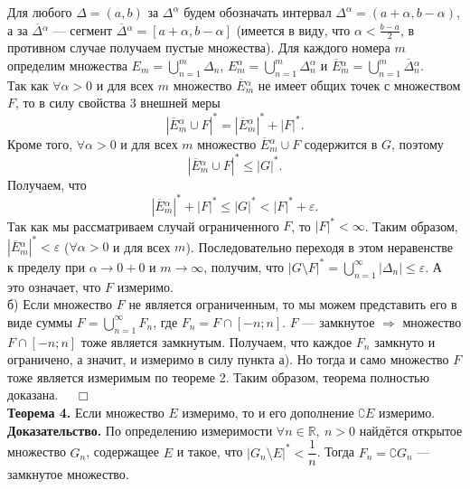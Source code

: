 \documentclass[12pt,a4paper, titlepage]{article}
\begin{document}
Для любого $\Delta = (a, b)$ за $\Delta^\alpha$ будем обозначать интервал $\Delta^\alpha = (a + \alpha, b - \alpha)$, а за $\overline{\Delta}{}^\alpha$ --- сегмент $\overline{\Delta}{}^\alpha = [a + \alpha, b - \alpha]$ (имеется в виду, что $\alpha < \frac{b-a} 2$, в противном случае получаем пустые множества). Для каждого номера $m$ определим множества $E_m = \bigcup\limits_{n=1}^m \Delta_n$, $E_m^\alpha = \bigcup\limits_{n=1}^m \Delta_n^\alpha$ и $\overline{E}{}_m^\alpha = \bigcup\limits_{n=1}^m \overline{\Delta}{}_n^\alpha$.\\

Так как $\forall \alpha > 0$ и для всех $m$ множество $\overline{E}{}_m^\alpha$ не имеет общих точек с множеством $F$, то в силу свойства 3 внешней меры
$$
|\overline{E}{}_m^\alpha \cup F|^* = |\overline{E}{}_m^\alpha|^* + |F|^*.
$$
Кроме того, $\forall \alpha > 0$ и для всех $m$ множество $\overline{E}{}_m^\alpha \cup F$ содержится в $G$, поэтому
$$
|\overline{E}{}_m^\alpha \cup F|^* \leqslant |G|^*.
$$
Получаем, что
$$
|\overline{E}{}_m^\alpha|^* + |F|^* \leqslant |G|^* < |F|^* + \varepsilon.
$$
Так как мы рассматриваем случай ограниченного $F$, то $|F|^* < \infty$. Таким образом, $|\overline{E}{}_m^\alpha|^* < \varepsilon$ ($\forall \alpha > 0$ и для всех $m$). Последовательно переходя в этом неравенстве к пределу при $\alpha \to 0 + 0$ и $m \to \infty$, получим, что $|G \setminus F|^* = \bigcup\limits_{n=1}^\infty |\Delta_n| \leqslant \varepsilon$. А это означает, что $F$ измеримо.\\

б) Если множество $F$ не является ограниченным, то мы можем представить его в виде суммы $F = \bigcup\limits_{n=1}^\infty F_n$, где $F_n = F \cap [-n; n]$. $F$ --- замкнутое $\Rightarrow$ множество $F \cap [-n; n]$ тоже является замкнутым. Получаем, что каждое $F_n$ замкнуто и ограничено, а значит, и измеримо в силу пункта а). Но тогда и само множество $F$ тоже является измеримым по теореме 2. Таким образом, теорема полностью доказана. $\quad \Box$\\


\textbf{Теорема 4.} Если множество $E$ измеримо, то и его дополнение $\complement E$ измеримо.\\
\textbf{Доказательство.}
По определению измеримости $\forall  n \in \mathbb{R}, \ n > 0$ найдётся открытое множество $G_n$, содержащее $E$ и такое, что $|G_n \setminus E|^* < \dfrac 1 n$. Тогда $F_n = \complement G_n$ --- замкнутое множество.\\ 
\end{document}
